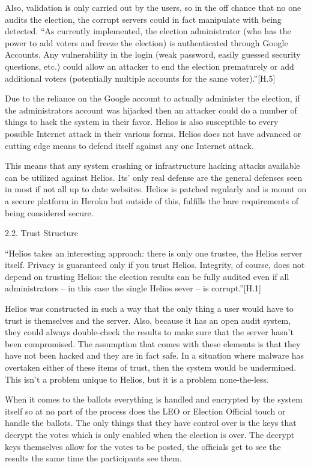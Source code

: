 Also, validation is only carried out by the users, so in the off chance that no one audits the election, the corrupt servers could in fact manipulate with being detected. ``As currently implemented, the election administrator (who has the power to add voters and freeze the election) is authenticated through Google Accounts. Any vulnerability in the login (weak password, easily guessed security questions, etc.) could allow an attacker to end the election prematurely or add additional voters (potentially multiple accounts for the same voter).''[H.5]

Due to the reliance on the Google account to actually administer the election, if the administrators account was hijacked then an attacker could do a number of things to hack the system in their favor. Helios is also susceptible to every possible Internet attack in their various forms. Helios does not have advanced or cutting edge means to defend itself against any one Internet attack.

This means that any system crashing or infrastructure hacking attacks available can be utilized against Helios. Its' only real defense are the general defenses seen in most if not all up to date websites. Helios is patched regularly and is mount on a secure platform in Heroku but outside of this, fulfills the bare requirements of being considered secure.

2.2. Trust Structure

``Helios takes an interesting approach: there is only one trustee, the Helios server itself. Privacy is guaranteed only if you trust Helios. Integrity, of course, does not depend on trusting Helios: the election results can be fully audited even if all administrators -- in this case the single Helios sever -- is corrupt.''[H.1]

Helios was constructed in such a way that the only thing a user would have to trust is themselves and the server. Also, because it has an open audit system, they could always double-check the results to make sure that the server hasn't been compromised. The assumption that comes with these elements is that they have not been hacked and they are in fact safe. In a situation where malware has overtaken either of these items of trust, then the system would be undermined. This isn't a problem unique to Helios, but it is a problem none-the-less.

When it comes to the ballots everything is handled and encrypted by the system itself so at no part of the process does the LEO or Election Official touch or handle the ballots. The only things that they have control over is the keys that decrypt the votes which is only enabled when the election is over. The decrypt keys themselves allow for the votes to be posted, the officials get to see the results the same time the participants see them.

